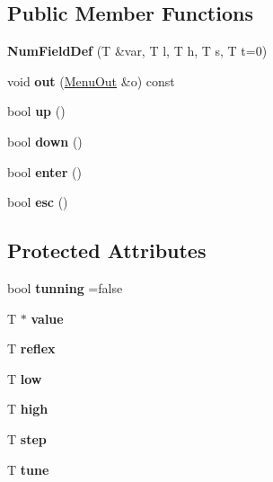 \subsection*{Public Member Functions}
\begin{DoxyCompactItemize}
\item 
\mbox{\label{classNumFieldDef_abe289e06a8e19cb98b91a608cee2722e}} 
{\bfseries Num\+Field\+Def} (T \&var, T l, T h, T s, T t=0)
\item 
\mbox{\label{classNumFieldDef_aa1b2d8d9ee507ceccf9cb468caca6f51}} 
void {\bfseries out} (\hyperlink{structMenuOut}{Menu\+Out} \&o) const
\item 
\mbox{\label{classNumFieldDef_ad3487f5b4559214c9bbb46caa0d54764}} 
bool {\bfseries up} ()
\item 
\mbox{\label{classNumFieldDef_ac7e902712c7a98bafe0ab6efe0183773}} 
bool {\bfseries down} ()
\item 
\mbox{\label{classNumFieldDef_a2203c8f7c2374d9c91bd5d0d0524b523}} 
bool {\bfseries enter} ()
\item 
\mbox{\label{classNumFieldDef_a47e8f80b3c09930e4117251617edcfa2}} 
bool {\bfseries esc} ()
\end{DoxyCompactItemize}
\subsection*{Protected Attributes}
\begin{DoxyCompactItemize}
\item 
\mbox{\label{classNumFieldDef_a15b9e2585b2c814c611cd8d8609d7ad5}} 
bool {\bfseries tunning} =false
\item 
\mbox{\label{classNumFieldDef_a558ca12ca78ce3cbfc55261baf4d96f3}} 
T $\ast$ {\bfseries value}
\item 
\mbox{\label{classNumFieldDef_a9a18a3e3f61eeeae20494671a8b2886e}} 
T {\bfseries reflex}
\item 
\mbox{\label{classNumFieldDef_af3044afe35d7dc0d2feeb56415f69cd2}} 
T {\bfseries low}
\item 
\mbox{\label{classNumFieldDef_a86a1c4df3f3f52ac30d99d4bcb114cc0}} 
T {\bfseries high}
\item 
\mbox{\label{classNumFieldDef_aae57d77ca732894839b9fdf61792c44c}} 
T {\bfseries step}
\item 
\mbox{\label{classNumFieldDef_aeffccb9468af3d97d9cfe60493261b72}} 
T {\bfseries tune}
\end{DoxyCompactItemize}


